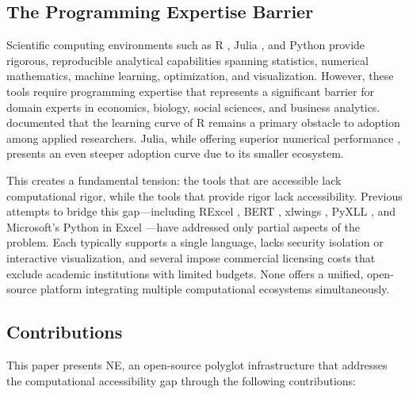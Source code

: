 \documentclass[preprint,12pt,authoryear]{elsarticle}
\newcommand{\neven}{NE\raisebox{0.2ex}{v}\rotatebox[origin=c]{180}{E}\rotatebox[origin=c]{180}{N}}
\begin{document}
\subsection{The Programming Expertise Barrier}

Scientific computing environments such as R \citep{RCoreTeam2024}, Julia \citep{Bezanson2017}, and Python \citep{VanRossum2009} provide rigorous, reproducible analytical capabilities spanning statistics, numerical mathematics, machine learning, optimization, and visualization. However, these tools require programming expertise that represents a significant barrier for domain experts in economics, biology, social sciences, and business analytics. \citet{Muenchen2012} documented that the learning curve of R remains a primary obstacle to adoption among applied researchers. Julia, while offering superior numerical performance \citep{Bezanson2017}, presents an even steeper adoption curve due to its smaller ecosystem.

This creates a fundamental tension: the tools that are accessible lack computational rigor, while the tools that provide rigor lack accessibility. Previous attempts to bridge this gap---including RExcel \citep{Baier2011}, BERT \citep{BERT2018}, xlwings \citep{xlwings2023}, PyXLL \citep{PyXLL2023}, and Microsoft's Python in Excel \citep{MicrosoftPython2023}---have addressed only partial aspects of the problem. Each typically supports a single language, lacks security isolation or interactive visualization, and several impose commercial licensing costs that exclude academic institutions with limited budgets. None offers a unified, open-source platform integrating multiple computational ecosystems simultaneously.

\subsection{Contributions}

This paper presents \neven{}, an open-source polyglot infrastructure that addresses the computational accessibility gap through the following contributions:
\end{document}
